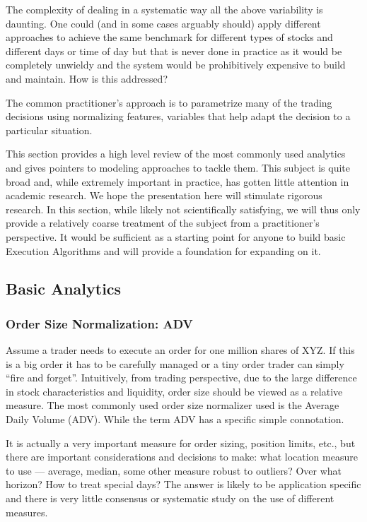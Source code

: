 The complexity of dealing in a systematic way all the above variability is  daunting. One could (and in some cases arguably should) apply different approaches to achieve the same benchmark for different types of stocks and different days or time of day but that is never done in practice as it would be completely unwieldy and the system would be prohibitively expensive to build and maintain. How is this addressed?


The common practitioner's approach is to parametrize many of the trading decisions using normalizing features, variables that help adapt the decision to a particular situation. 


This section provides a high level review of the most commonly used analytics and gives pointers to modeling approaches to tackle them. This subject is quite broad and, while extremely important in practice, has gotten little attention in academic research. We hope the presentation here will stimulate rigorous research. In this section, while likely not scientifically satisfying, we  will thus only provide a relatively coarse treatment of the subject from a practitioner's perspective. It would be sufficient as a starting point for anyone to build basic Execution Algorithms and will provide a foundation for expanding on it.


\subsection{Basic Analytics}
\subsubsection{Order Size Normalization: ADV}
Assume a trader needs to execute an order for one million shares of XYZ. If this is a big order it has to be carefully managed or a tiny order trader can simply ``fire and forget''.  Intuitively, from trading perspective, due to  the large difference in stock characteristics and liquidity, order size should be viewed as a relative measure. The most commonly used order size normalizer used is the Average Daily Volume (ADV). While the term ADV has a specific simple connotation.


It is actually a very important measure for order sizing, position limits, etc., but there are important considerations and decisions to make: what location measure to use --- average, median, some other measure robust to outliers? Over what horizon? How to treat special days? The answer is likely to be application specific and there is very little consensus or systematic study on the use of different measures.
 	
